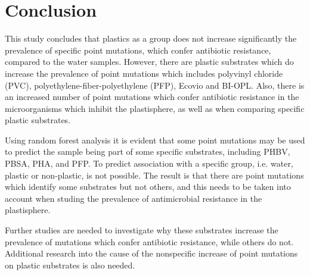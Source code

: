 \chapter{Conclusion}


This study concludes that plastics as a group does not increase significantly the prevalence of specific point mutations, which confer antibiotic resistance, compared to the water samples. 
However, there are plastic substrates which do increase the prevalence of point mutations which includes polyvinyl chloride (PVC), polyethylene-fiber-polyethylene (PFP), Ecovio and BI-OPL. 
Also, there is an increased number of point mutations which confer antibiotic resistance in the microorganisms which inhibit the plastisphere, as well as when comparing specific plastic substrates.

Using random forest analysis it is evident that some point mutations may be used to predict the sample being part of some specific substrates, including PHBV, PBSA, PHA, and PFP. To predict association with a specific group, i.e. water, plastic or non-plastic, is not possible.
The result is that there are point mutations which identify some substrates but not others, and this needs to be taken into account when studing the prevalence of antimicrobial resistance in the plastisphere.

Further studies are needed to investigate why these substrates increase the prevalence of mutations which confer antibiotic resistance, while others do not.
Additional research into the cause of the nonspecific increase of point mutations on plastic substrates is also needed. 
